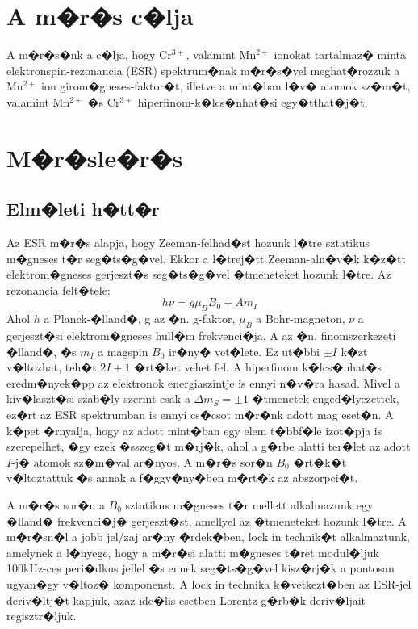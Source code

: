 \documentclass[a4paper,12pt]{article}
\begin{document}
\newpage

\section{A m�r�s c�lja}

A m�r�s�nk a c�lja, hogy Cr$^{3+}$, valamint Mn$^{2+}$ ionokat tartalmaz� minta elektronspin-rezonancia (ESR) spektrum�nak m�r�s�vel meghat�rozzuk a Mn$^{2+}$ ion girom�gneses-faktor�t, illetve a mint�ban l�v� atomok sz�m�t, valamint Mn$^{2+}$ �s Cr$^{3+}$ hiperfinom-k�lcs�nhat�si egy�tthat�j�t.

\section{M�r�sle�r�s}

\subsection{Elm�leti h�tt�r}

Az ESR m�r�s alapja, hogy Zeeman-felhad�st hozunk l�tre sztatikus m�gneses t�r seg�ts�g�vel. Ekkor a l�trej�tt Zeeman-aln�v�k k�z�tt elektrom�gneses gerjeszt�s seg�ts�g�vel  �tmeneteket hozunk l�tre. 
Az rezonancia felt�tele:
\begin{equation}
h \nu = g \mu_{B}B_0 + A m_I
\label{eq:1}
\end{equation}
Ahol $h$ a Planck-�lland�, g az �n. g-faktor, $\mu_B$ a Bohr-magneton, $\nu$ a gerjeszt�si
elektrom�gneses hull�m frekvenci�ja, A az �n. finomszerkezeti �lland�, �s $m_I$ a magspin $B_0$ ir�ny� vet�lete.
Ez ut�bbi $\pm I$ k�zt v�ltozhat, teh�t $2I+1$ �rt�ket vehet fel. A hiperfinom k�lcs�nhat�s eredm�nyek�pp az elektronok 
energiaszintje is ennyi n�v�ra hasad. Mivel a kiv�laszt�si szab�ly szerint csak a $\Delta m_S= \pm 1$ �tmenetek enged�lyezettek, ez�rt az ESR spektrumban is ennyi cs�csot m�r�nk adott mag eset�n. A k�pet �rnyalja, hogy az adott mint�ban egy elem t�bbf�le izot�pja is szerepelhet, �gy ezek �sszeg�t m�rj�k, ahol a g�rbe alatti ter�let az adott $I$-j� atomok sz�m�val ar�nyos.
A m�r�s sor�n $B_0$ �rt�k�t v�ltoztattuk �s annak a f�ggv�ny�ben m�rt�k az abszorpci�t. 

A m�r�s sor�n a $B_0$ sztatikus m�gneses t�r mellett alkalmazunk egy �lland� frekvenci�j�  gerjeszt�st, amellyel az �tmeneteket hozunk l�tre. 
A m�r�sn�l a jobb jel/zaj ar�ny �rdek�ben,  lock in technik�t alkalmaztunk, amelynek a l�nyege, hogy a m�r�si alatti m�gneses t�ret modul�ljuk 100kHz-ces  peri�dkus jellel �s ennek seg�ts�g�vel kisz�rj�k a pontosan ugyan�gy v�ltoz� komponenst. A lock in technika k�vetkezt�ben az ESR-jel deriv�ltj�t kapjuk, azaz ide�lis esetben Lorentz-g�rb�k deriv�ljait regisztr�ljuk.
\end{document}

